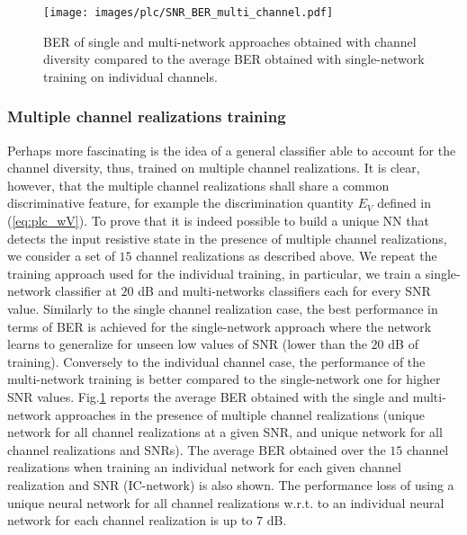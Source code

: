 \begin{figure}
\centering
  	\texttt{[image: images/plc/SNR\_BER\_multi\_channel.pdf]}
  	\caption{BER of single and multi-network approaches obtained with channel diversity compared to the average BER obtained with single-network training on individual channels.}
  	\label{fig:plc_ber2}
\end{figure}

\subsubsection{Multiple channel realizations training}
Perhaps more fascinating is the idea of a general classifier able to account for the channel diversity, thus, trained on multiple channel realizations. It is clear, however, that the multiple channel realizations shall share a common discriminative feature, for example the discrimination quantity $E_V$ defined in (\ref{eq:plc_wV}). To prove that it is indeed possible to build a unique NN that detects the input resistive state in the presence of multiple channel realizations, we consider a set of $15$ channel realizations as described above. We repeat the training approach used for the individual training, in particular, we train a single-network classifier at $20$ dB and multi-networks classifiers each for every SNR value. Similarly to the single channel realization case, the best performance in terms of BER is achieved for the single-network approach where the network learns to generalize for unseen low values of SNR (lower than the $20$ dB of training). Conversely to the individual channel case, the performance of the multi-network training is better compared to the single-network one for higher SNR values.
Fig.\ref{fig:plc_ber2} reports the average BER obtained with the single and multi-network approaches in the presence of multiple channel realizations (unique network for all channel realizations at a given SNR, and unique network for all channel realizations and SNRs). The average BER obtained over the $15$ channel realizations when training an individual network for each given channel realization and SNR (IC-network) is also shown. The performance loss of using a unique neural network for all channel realizations w.r.t. to an individual neural network for each channel realization is up to $7$ dB.

